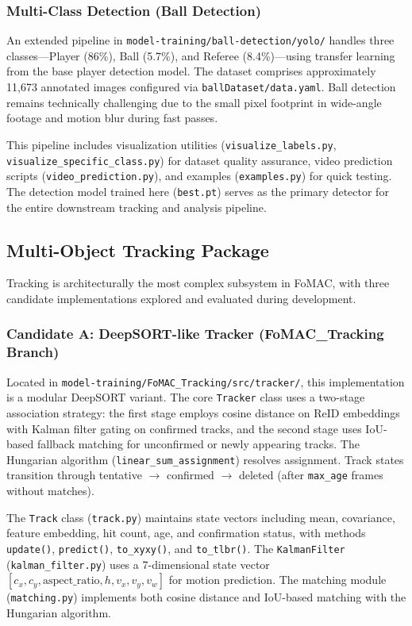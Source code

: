 \documentclass[10pt,twocolumn,a4paper]{article}
\begin{document}
\subsubsection{Multi-Class Detection (Ball Detection)}
An extended pipeline in \texttt{model-training/ball-detection/yolo/} handles three classes---Player (86\%), Ball (5.7\%), and Referee (8.4\%)---using transfer learning from the base player detection model. The dataset comprises approximately 11,673 annotated images configured via \texttt{ballDataset/data.yaml}. Ball detection remains technically challenging due to the small pixel footprint in wide-angle footage and motion blur during fast passes.

This pipeline includes visualization utilities (\texttt{visualize\_labels.py}, \texttt{visualize\_specific\_class.py}) for dataset quality assurance, video prediction scripts (\texttt{video\_prediction.py}), and examples (\texttt{examples.py}) for quick testing. The detection model trained here (\texttt{best.pt}) serves as the primary detector for the entire downstream tracking and analysis pipeline.

\subsection{Multi-Object Tracking Package}

Tracking is architecturally the most complex subsystem in FoMAC, with three candidate implementations explored and evaluated during development.

\subsubsection{Candidate A: DeepSORT-like Tracker (FoMAC\_Tracking Branch)}
Located in \texttt{model-training/FoMAC\_Tracking/src/tracker/}, this implementation is a modular DeepSORT variant. The core \texttt{Tracker} class uses a two-stage association strategy: the first stage employs cosine distance on ReID embeddings with Kalman filter gating on confirmed tracks, and the second stage uses IoU-based fallback matching for unconfirmed or newly appearing tracks. The Hungarian algorithm (\texttt{linear\_sum\_assignment}) resolves assignment. Track states transition through tentative $\rightarrow$ confirmed $\rightarrow$ deleted (after \texttt{max\_age} frames without matches).

The \texttt{Track} class (\texttt{track.py}) maintains state vectors including mean, covariance, feature embedding, hit count, age, and confirmation status, with methods \texttt{update()}, \texttt{predict()}, \texttt{to\_xyxy()}, and \texttt{to\_tlbr()}. The \texttt{KalmanFilter} (\texttt{kalman\_filter.py}) uses a 7-dimensional state vector $[c_x, c_y, \text{aspect\_ratio}, h, v_x, v_y, v_w]$ for motion prediction. The matching module (\texttt{matching.py}) implements both cosine distance and IoU-based matching with the Hungarian algorithm.
\end{document}
